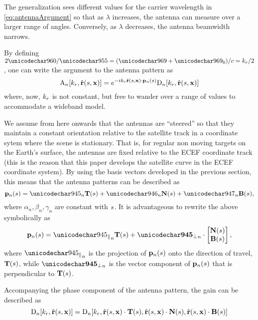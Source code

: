 The  generalization sees different values for the carrier wavelength in \eqref{eq:antennaArgument} so that as $\lambda$ increases, the antenna can measure over a larger range of angles. Conversely, as $\lambda$ decreases, the antenna beamwidth narrows.
\par
By defining $2\pi/\lambda=(\omega+\omega_0)/c=\kr/2$, one can write the argument to the antenna pattern as
\begin{equation}
\pattern{\channelIndex}[\kr, \uRangeVectorParm]=\eex{-\im\kr\uRangeVectorParm\cdot\pAntennaParm{\channelIndex}}\dPattern{\channelIndex}[\kr, \uRangeVectorParm]
\label{eq:antennaArgument2}
\end{equation}
where, now, $k_r$ is not constant, but free to wander over a range of values to accommodate a \gls{wideband} model.
\par
We assume from here onwards that the antennas are ``steered'' so that they maintain a constant orientation relative to the satellite track in a coordinate sytem where the scene is stationary. That is, for regular non moving targets on the Earth's surface, the antennas are fixed relative to the ECEF coordinate track (this is the reason that this paper develops the satellite curve in the ECEF coordinate system). By using the basis vectors developed in the previous section, this means that the antenna patterns can be described as
\begin{equation}
 \pAntennaParm{\channelIndex} = \alpha_n\vct{T}(\parm) + \beta_n\vct{N}(\parm) + \gamma_n\vct{B}(\parm),
\end{equation}
where $\alpha_n, \beta_n, \gamma_n$ are constant with $s$. It is advantageous to rewrite the above symbolically as
\begin{equation}
 \pAntennaParm{\channelIndex} = \alongtrack\vct{T}(\parm) + \acrosstrack\cdot\begin{bmatrix}\vct{N}(\parm)\\\vct{B}(\parm)\end{bmatrix},
 \label{eq:spaceDiversityCurve}
\end{equation}
where $\alongtrack$ is the projection of $\mathbf{p}_{n}(s)$ onto the direction of travel, $\mathbf{T}(s)$, while $\acrosstrack$ is the vector component of $\mathbf{p}_{n}(s)$ that is perpendicular to $\mathbf{T}(s)$.
\par
Accompanying the phase component of the antenna pattern, the gain can be described as
\begin{equation}
 \dPattern{\channelIndex}[\kr, \uRangeVectorParm] = \dPattern{\channelIndex}[\kr, \uRangeVectorParm\cdot\vct{T}(\parm), \uRangeVectorParm\cdot\vct{N}(\parm), \uRangeVectorParm\cdot\vct{B}(\parm)]
 \label{eq:antennaDiversityCurve}
\end{equation}
